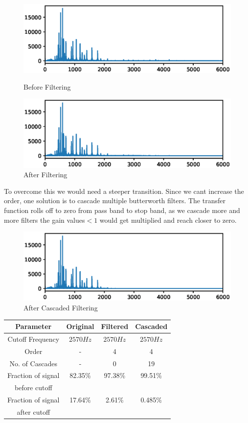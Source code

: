 \documentclass[journal,12pt,twocolumn]{IEEEtran}
\begin{document}
\begin{figure}[H]
\centering
\includegraphics[width=1\columnwidth]{./figures/before.eps}
\caption{Before Filtering}
\label{fig:Figure0}
\includegraphics[width=1\columnwidth]{./figures/after-1.eps}
\caption{After Filtering}
\label{fig:Figure1}
\end{figure}

    To overcome this we would need a steeper transition. Since we cant increase the order, one solution is to cascade multiple butterworth filters. The transfer function rolls off to zero from pass band to stop band, as we cascade more and more filters the gain values$<1$ would get multiplied and reach closer to zero.

\begin{figure}[H]
\centering
\includegraphics[width=1\columnwidth]{./figures/after-2.eps}
\caption{After Cascaded Filtering}
\label{fig:Figure1}
\end{figure}



\begin{center}
\begin{tabular}{ |c|c|c|c| } 
 \hline
 Parameter & Original & Filtered & Cascaded\\
 \hline
 Cutoff Frequency & $2570Hz$ & $2570 Hz$ & $2570 Hz$\\ 
 \hline
 Order & - & 4 & 4 \\ 
 \hline
No. of Cascades & - & 0 & 19 \\ 
 \hline
Fraction of signal & 82.35\% & 97.38\% &  99.51\%\\
before cutoff & & &\\
\hline
Fraction of signal  & 17.64\% & 2.61\%  & 0.485\%\\
after cutoff & & &\\
\hline
\end{tabular}
\end{center}
\end{document}
